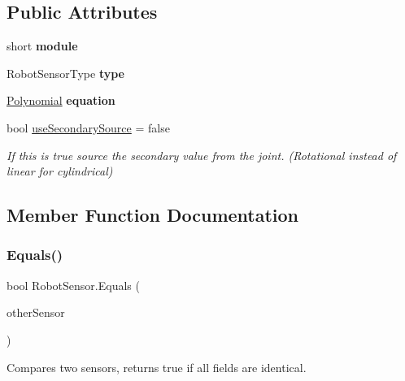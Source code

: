 \subsection*{Public Attributes}
\begin{DoxyCompactItemize}
\item 
\mbox{\label{class_robot_sensor_adcf031bd4ae11d7c3508e1d616221a82}} 
short {\bfseries module}
\item 
\mbox{\label{class_robot_sensor_a3f99ada48ed6fc7d2c9578633885df4d}} 
Robot\+Sensor\+Type {\bfseries type}
\item 
\mbox{\label{class_robot_sensor_a68fc5a00526936c2e21130a672111513}} 
\hyperlink{class_polynomial}{Polynomial} {\bfseries equation}
\item 
bool \hyperlink{class_robot_sensor_ad6c16b11683315a18bd63117384d3692}{use\+Secondary\+Source} = false
\begin{DoxyCompactList}\small\item\em If this is true source the secondary value from the joint. (Rotational instead of linear for cylindrical) \end{DoxyCompactList}\end{DoxyCompactItemize}


\subsection{Member Function Documentation}
\mbox{\label{class_robot_sensor_ad72161168e60cb70a19014de7d49ebc6}} 
\subsubsection{\texorpdfstring{Equals()}{Equals()}}
{\footnotesize\ttfamily bool Robot\+Sensor.\+Equals (\begin{DoxyParamCaption}\item[{\hyperlink{class_robot_sensor}{Robot\+Sensor}}]{other\+Sensor }\end{DoxyParamCaption})}



Compares two sensors, returns true if all fields are identical. 



